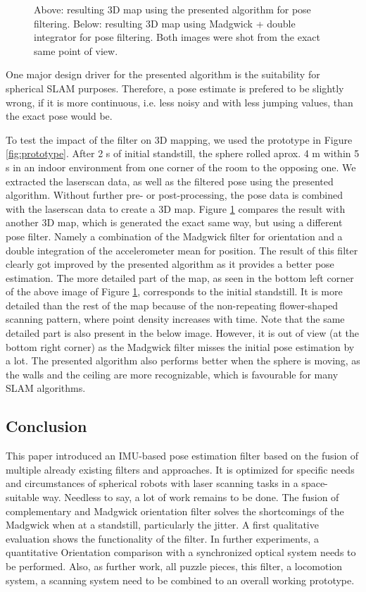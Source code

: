 \documentclass[letterpaper, 10 pt, conference]{ieeeconf}  %
\begin{document}
\begin{figure}
\begin{center}
\caption{Above: resulting 3D map using the presented algorithm for pose filtering. Below: resulting 3D map using Madgwick + double integrator for pose filtering. Both images were shot from the exact same point of view. }
\label{fig:mapping}
\end{center}
\end{figure}

One major design driver for the presented algorithm is the suitability for spherical SLAM purposes.
Therefore, a pose estimate is prefered to be slightly wrong, if it is more continuous, i.e. less noisy and with less jumping values, than the exact pose would be.

To test the impact of the filter on 3D mapping, we used the prototype in Figure \ref{fig:prototype}.
After 2 s of initial standstill, the sphere rolled aprox. 4 m within 5 s in an indoor environment from one corner of the room to the opposing one.
We extracted the laserscan data, as well as the filtered pose using the presented algorithm.
Without further pre- or post-processing, the pose data is combined with the laserscan data to create a 3D map.
Figure \ref{fig:mapping} compares the result with another 3D map, which is generated the exact same way, but using a different pose filter.
Namely a combination of the Madgwick filter for orientation and a double integration of the accelerometer mean for position.
The result of this filter clearly got improved by the presented algorithm as it provides a better pose estimation.
The more detailed part of the map, as seen in the bottom left corner of the above image of Figure \ref{fig:mapping}, corresponds to the initial standstill.
It is more detailed than the rest of the map because of the non-repeating flower-shaped scanning pattern, where point density increases with time.
Note that the same detailed part is also present in the below image.
However, it is out of view (at the bottom right corner) as the Madgwick filter misses the initial pose estimation by a lot. 
The presented algorithm also performs better when the sphere is moving, as the walls and the ceiling are more recognizable, which is favourable for many SLAM algorithms.


\subsection{Conclusion}
This paper introduced an IMU-based pose estimation filter based on the fusion of multiple already existing filters and approaches.
It is optimized for specific needs and circumstances of spherical robots with laser scanning tasks in a space-suitable way.
Needless to say, a lot of work remains to be done.
The fusion of complementary and Madgwick orientation filter solves the shortcomings of the Madgwick when at a standstill, particularly the jitter.
A first qualitative evaluation shows the functionality of the filter.
In further experiments, a quantitative Orientation comparison with a synchronized optical system needs to be performed.
Also, as further work, all puzzle pieces, this filter, a locomotion system, a scanning system need to be combined to an overall working prototype.
\end{document}
